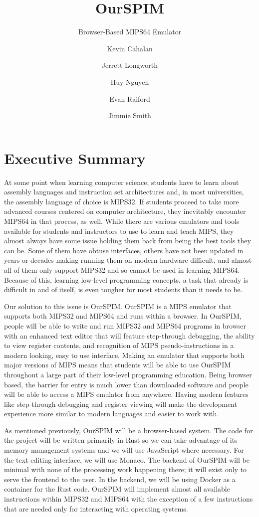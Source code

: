 \documentclass[parskip=half, fontsize=12pt]{scrartcl}
\title{OurSPIM}
\subtitle{Browser-Based MIPS64 Emulator}
\author{
    Kevin Cahalan
    \and
    Jerrett Longworth
    \and
    Huy Nguyen
    \and
    Evan Raiford
    \and
    Jimmie Smith
}
\begin{document}
\renewcommand*{\titlepagestyle}{empty}
\maketitle
\clearpage

\setcounter{page}{1}
\tableofcontents
\clearpage


\setcounter{page}{1}
\section{Executive Summary}

At some point when learning computer science, students have to learn about assembly languages and instruction set architectures and, in most universities, the assembly language of choice is MIPS32. If students proceed to take more advanced courses centered on computer architecture, they inevitably encounter MIPS64 in that process, as well. While there are various emulators and tools available for students and instructors to use to learn and teach MIPS, they almost always have some issue holding them back from being the best tools they can be. Some of them have obtuse interfaces, others have not been updated in years or decades making running them on modern hardware difficult, and almost all of them only support MIPS32 and so cannot be used in learning MIPS64. Because of this, learning low-level programming concepts, a task that already is difficult in and of itself, is even tougher for most students than it needs to be.

Our solution to this issue is OurSPIM. OurSPIM is a MIPS emulator that supports both MIPS32 and MIPS64 and runs within a browser. In OurSPIM, people will be able to write and run MIPS32 and MIPS64 programs in browser with an enhanced text editor that will feature step-through debugging, the ability to view register contents, and recognition of MIPS pseudo-instructions in a modern looking, easy to use interface. Making an emulator that supports both major versions of MIPS means that students will be able to use OurSPIM throughout a large part of their low-level programming education. Being browser based, the barrier for entry is much lower than downloaded software and people will be able to access a MIPS emulator from anywhere. Having modern features like step-through debugging and register viewing will make the development experience more similar to modern languages and easier to work with.

As mentioned previously, OurSPIM will be a browser-based system. The code for the project will be written primarily in Rust so we can take advantage of its memory management systems and we will use JavaScript where necessary. For the text editing interface, we will use Monaco. The backend of OurSPIM will be minimal with none of the processing work happening there; it will exist only to serve the frontend to the user. In the backend, we will be using Docker as a container for the Rust code. OurSPIM will implement almost all available instructions within MIPS32 and MIPS64 with the exception of a few instructions that are needed only for interacting with operating systems.
\end{document}
